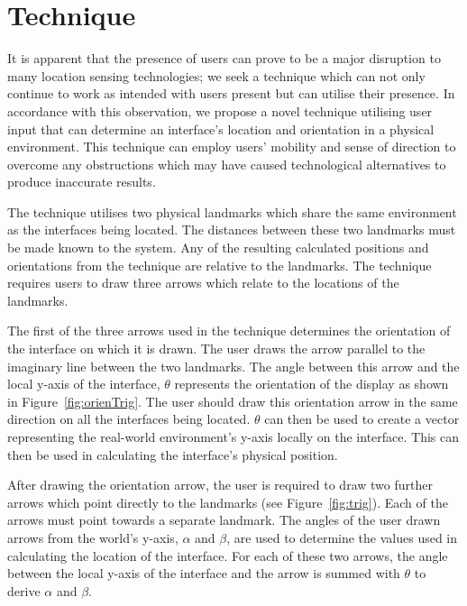 \documentclass{bmcart}
\begin{document}
\section*{Technique}\label{sec:technique}

It is apparent that the presence of users can prove to be a major disruption to many location sensing technologies; we seek a technique which can not only continue to work as intended with users present but can utilise their presence.
In accordance with this observation, we propose a novel technique utilising user input that can determine an interface's location and orientation in a physical environment.
This technique can employ users' mobility and sense of direction to overcome any obstructions which may have caused technological alternatives to produce inaccurate results.

The technique utilises two physical landmarks which share the same environment as the interfaces being located.
The distances between these two landmarks must be made known to the system.
Any of the resulting calculated positions and orientations from the technique are relative to the landmarks.
The technique requires users to draw three arrows which relate to the locations of the landmarks.


The first of the three arrows used in the technique determines the orientation of the interface on which it is drawn.
The user draws the arrow parallel to the imaginary line between the two landmarks.
The angle between this arrow and the local y-axis of the interface, $\theta$ represents the orientation of the display as shown in Figure~\ref{fig:orienTrig}.
The user should draw this orientation arrow in the same direction on all the interfaces being located.
\textbf{$\theta$} can then be used to create a vector representing the real-world environment's y-axis locally on the interface.
This can then be used in calculating the interface's physical position.


After drawing the orientation arrow, the user is required to draw two further arrows which point directly to the landmarks (see Figure~\ref{fig:trig}).
Each of the arrows must point towards a separate landmark.
The angles of the user drawn arrows from the world's y-axis, $\alpha$ and $\beta$, are used to determine the values used in calculating the location of the interface.
For each of these two arrows, the angle between the local y-axis of the interface and the arrow is summed with $\theta$ to derive $\alpha$ and $\beta$.
\end{document}
